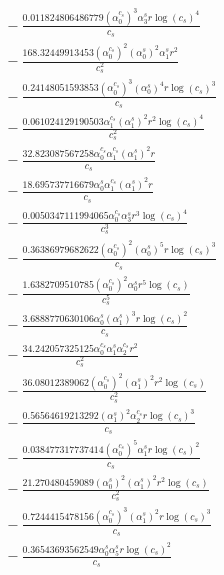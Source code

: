 \documentclass[10pt]{article}
\begin{document}
\begin{align*}
&{}  - \frac{0.011824806486779 \left(\alpha_{0}^{c_s}\right)^{3} \alpha_{3}^s r \log{\left(c_{s} \right)}^{4}}{c_{s}} \\
&{}  - \frac{168.32449913453 \left(\alpha_{0}^{c_s}\right)^{2} \left(\alpha_{0}^s\right)^{2} \alpha_{1}^s r^{2}}{c_{s}^{2}} \\
&{}  - \frac{0.24148051593853 \left(\alpha_{0}^{c_s}\right)^{3} \left(\alpha_{0}^s\right)^{4} r \log{\left(c_{s} \right)}^{3}}{c_{s}} \\
&{}  - \frac{0.061024129190503 \alpha_{1}^{c_s} \left(\alpha_{1}^s\right)^{2} r^{2} \log{\left(c_{s} \right)}^{4}}{c_{s}^{2}} \\
&{}  - \frac{32.823087567258 \alpha_{0}^{c_s} \alpha_{1}^{c_s} \left(\alpha_{1}^s\right)^{2} r}{c_{s}} \\
&{}  - \frac{18.695737716679 \alpha_{0}^s \alpha_{1}^{c_s} \left(\alpha_{1}^s\right)^{2} r}{c_{s}} \\
&{}  - \frac{0.0050347111994065 \alpha_{0}^{c_s} \alpha_{3}^s r^{3} \log{\left(c_{s} \right)}^{4}}{c_{s}^{3}} \\
&{}  - \frac{0.36386979682622 \left(\alpha_{0}^{c_s}\right)^{2} \left(\alpha_{0}^s\right)^{5} r \log{\left(c_{s} \right)}^{3}}{c_{s}} \\
&{}  - \frac{1.6382709510785 \left(\alpha_{0}^{c_s}\right)^{2} \alpha_{0}^s r^{5} \log{\left(c_{s} \right)}}{c_{s}^{5}} \\
&{}  - \frac{3.6888770630106 \alpha_{0}^s \left(\alpha_{1}^s\right)^{3} r \log{\left(c_{s} \right)}^{2}}{c_{s}} \\
&{}  - \frac{34.242057325125 \alpha_{0}^{c_s} \alpha_{1}^s \alpha_{2}^{c_s} r^{2}}{c_{s}^{2}} \\
&{}  - \frac{36.08012389062 \left(\alpha_{0}^{c_s}\right)^{2} \left(\alpha_{1}^s\right)^{2} r^{2} \log{\left(c_{s} \right)}}{c_{s}^{2}} \\
&{}  - \frac{0.56564619213292 \left(\alpha_{1}^s\right)^{2} \alpha_{2}^{c_s} r \log{\left(c_{s} \right)}^{3}}{c_{s}} \\
&{}  - \frac{0.038477317737414 \left(\alpha_{0}^{c_s}\right)^{5} \alpha_{1}^s r \log{\left(c_{s} \right)}^{2}}{c_{s}} \\
&{}  - \frac{21.270480459089 \left(\alpha_{0}^s\right)^{2} \left(\alpha_{1}^s\right)^{2} r^{2} \log{\left(c_{s} \right)}}{c_{s}^{2}} \\
&{}  - \frac{0.7244415478156 \left(\alpha_{0}^{c_s}\right)^{3} \left(\alpha_{1}^s\right)^{2} r \log{\left(c_{s} \right)}^{3}}{c_{s}} \\
&{}  - \frac{0.36543693562549 \alpha_{0}^s \alpha_{5}^s r \log{\left(c_{s} \right)}^{2}}{c_{s}} \\

\end{align*}
\end{document}
